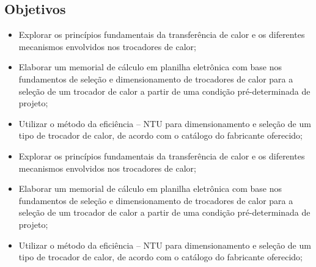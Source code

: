 \subsection{Objetivos}

\begin{itemize}
	
	\item Explorar os princípios fundamentais da transferência de calor e os diferentes mecanismos envolvidos nos trocadores de calor;
	\item Elaborar um memorial de cálculo em planilha eletrônica com base nos fundamentos de seleção e dimensionamento de trocadores de calor para a seleção de um trocador de calor a partir de uma condição pré-determinada de projeto;
	\item Utilizar o método da eficiência – NTU para dimensionamento e seleção de um tipo de trocador de calor, de acordo com o catálogo do fabricante oferecido;	 
	\item Explorar os princípios fundamentais da transferência de calor e os diferentes mecanismos envolvidos nos trocadores de calor;
	\item Elaborar um memorial de cálculo em planilha eletrônica com base nos fundamentos de seleção e dimensionamento de trocadores de calor para a seleção de um trocador de calor a partir de uma condição pré-determinada de projeto;
	\item Utilizar o método da eficiência – NTU para dimensionamento e seleção de um tipo de trocador de calor, de acordo com o catálogo do fabricante oferecido;
\end{itemize}